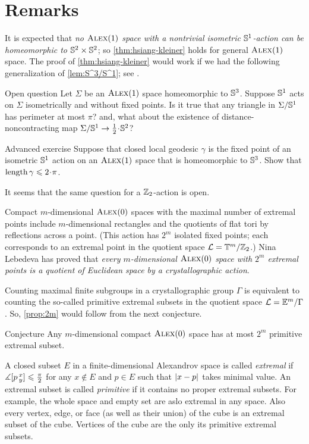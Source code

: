 \section{Remarks}

It is expected that \textit{no $\textsc{Alex}(1)$ space with a nontrivial isometric $\mathbb{S}^1$-action can be homeomorphic to $\mathbb{S}^2\times\mathbb{S}^2$};
so \ref{thm:hsiang-kleiner} holds for general $\textsc{Alex}(1)$ space.
The proof of \ref{thm:hsiang-kleiner} would work if we had the following generalization of \ref{lem:S^3/S^1};
see \cite{harvey-searle}.

\begin{thm}{Open question}
Let $\Sigma$ be an $\textsc{Alex}(1)$ space homeomorphic to $\mathbb{S}^3$.
Suppose $\mathbb{S}^1$ acts on $\Sigma$ isometrically and without fixed points.
Is it true that any triangle in $\Sigma/\mathbb{S}^1$ has perimeter at most $\pi$?
and, what about the existence of distance-noncontracting map $\Sigma/\SSS^1\to \tfrac12\cdot\SSS^2$?
\end{thm}


\begin{thm}{Advanced exercise}
Suppose that closed local geodesic $\gamma$ is the fixed point of an isometric $\mathbb{S}^1$ action on an $\textsc{Alex}(1)$ space that is homeomorphic to $\mathbb{S}^3$.
Show that $\length\gamma\le2\cdot\pi$.
\end{thm}

It seems that the same question for a $\mathbb{Z}_2$-action is open.

Compact $m$-dimensional $\textsc{Alex}(0)$ spaces with the maximal number of extremal points include $m$-dimensional rectangles and the quotients of flat tori by reflections across a point.
(This action has $2^m$ isolated fixed points; each corresponds to an extremal point in the quotient space $\mathcal{L}=\mathbb{T}^m/\mathbb{Z}_2$.)
Nina Lebedeva has proved \cite{lebedeva} that \textit{every $m$-dimensional $\textsc{Alex}(0)$ space with $2^m$ extremal points is a quotient of Euclidean space by a crystallographic action}.

Counting maximal finite subgroups in a crystallographic group $\Gamma$ is equivalent to counting the so-called primitive extremal subsets in the quotient space $\mathcal{L}=\mathbb{E}^m/\Gamma$.
So, \ref{prop:2m} would follow from the next conjecture.

\begin{thm}{Conjecture}
Any $m$-dimensional compact $\textsc{Alex}(0)$ space has at most $2^m$ primitive extremal subset.
\end{thm}

A closed subset $E$ in a finite-dimensional Alexandrov space is called 
\emph{extremal} if $\mangle\hinge pxy\z\le \tfrac\pi2$ for any $x\notin E$ and $p\in E$ such that $\dist{x}{p}{}$ takes minimal value.
An extremal subset is called \emph{primitive} if it contains no proper extremal subsets.
For example, the whole space and empty set are aslo extremal in any space.
Also every vertex, edge, or face (as well as their union) of the cube is an extremal subset of the cube.
Vertices of the cube are the only its primitive extremal subsets.

